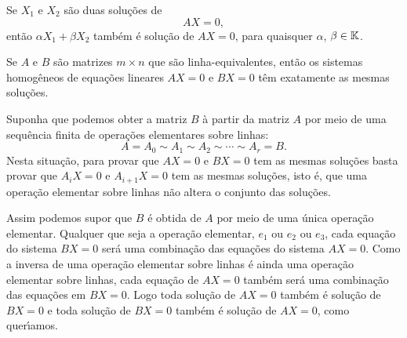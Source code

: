 \begin{teorema}
	Se $X_1$ e $X_2$ s\~ao duas solu\c{c}\~oes de
	\[
		AX = 0,
	\]
	ent\~ao $\alpha X_1 + \beta X_2$ tamb\'em \'e solu\c{c}\~ao de $AX = 0$, para quaisquer $\alpha$, $\beta \in \mathbb{K}$.
\end{teorema}

\begin{teorema}
	Se $A$ e $B$ s\~ao matrizes $m \times n$ que s\~ao linha-equivalentes, ent\~ao os sistemas homog\^eneos de equa\c{c}\~oes lineares $AX = 0$ e $BX = 0$ t\^em exatamente as mesmas solu\c{c}\~oes.
\end{teorema}
\begin{prova}
	Suponha que podemos obter a matriz $B$ \`a partir da matriz $A$ por meio de uma sequ\^encia finita de opera\c{c}\~oes elementares sobre linhas:
	\[
		A = A_0 \sim A_1 \sim A_2 \sim \cdots \sim A_r = B.
	\]
	Nesta situa\c{c}\~ao, para provar que $AX = 0$ e $BX = 0$ tem as mesmas solu\c{c}\~oes basta provar que $A_iX = 0$ e $A_{i + 1}X = 0$ tem as mesmas solu\c{c}\~oes, isto \'e, que uma opera\c{c}\~ao elementar sobre linhas n\~ao altera o conjunto das solu\c{c}\~oes.

	Assim podemos supor que $B$ \'e obtida de $A$ por meio de uma \'unica opera\c{c}\~ao elementar. Qualquer que seja a opera\c{c}\~ao elementar, $e_1$ ou $e_2$ ou $e_3$, cada equa\c{c}\~ao do sistema $BX = 0$ ser\'a uma combina\c{c}\~ao das equa\c{c}\~oes do sistema $AX = 0$. Como a inversa de uma opera\c{c}\~ao elementar sobre linhas \'e ainda uma opera\c{c}\~ao elementar sobre linhas, cada equa\c{c}\~ao de $AX = 0$ tamb\'em ser\'a uma combina\c{c}\~ao das equa\c{c}\~oes em $BX = 0$. Logo toda solu\c{c}\~ao de $AX = 0$ tamb\'em \'e solu\c{c}\~ao de $BX = 0$ e toda solu\c{c}\~ao de $BX = 0$ tamb\'em \'e solu\c{c}\~ao de $AX = 0$, como quer{\'\i}amos.
\end{prova}

